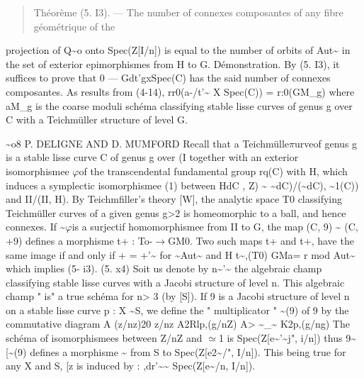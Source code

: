 \documentclass[11pt]{article}
\theoremstyle{plain}
\theoremstyle{definition}
\theoremstyle{remark}
\begin{document}
\begin{quote}Th\'eor\`eme (5. I3). --- The number of connexes composantes of any fibre g\'eom\'etrique of the\end{quote}
projection of Q\textasciitilde{}o onto Spec(Z[I/n]) is equal to the number of orbits of Aut\textasciitilde{} in the set of exterior epimorphismes from H to G. D\'emonstration. By (5. I3), it suffices to prove that 0 --- Gdt'gxSpec(C) has the said number of connexes composantes. As results from (4-14), rr0(a-/t'\textasciitilde{} X Spec(C)) = r:0(GM\_g) where aM\_g is the coarse moduli sch\'ema classifying stable lisse curves of genus g over C with a Teichm\"uller structure of level G.

\textasciitilde{}o8 P. DELIGNE AND D. MUMFORD Recall that a Teichm\"ulle$\pi$urveof genus g is a stable lisse curve C of genus g over (I together with an exterior isomorphismee $\varphi$of the transcendental fundamental group rq(C) with H, which induces a symplectic isomorphismee (1) between HdC , Z) \textasciitilde{} \textasciitilde{}dC)/(\textasciitilde{}dC), \textasciitilde{}1(C)) and II/(II, H). By Teichmfiller's theory [W], the analytic space T0 classifying Teichm\"uller curves of a given genus g>2 is homeomorphic to a ball, and hence connexes. If \textasciitilde{}$\varphi$is a surjectif homomorphismee from II to G, the map (C, 9) \textasciitilde{} (C, +9) defines a morphisme t+ : To-$\to$GM0. Two such maps t+ and t+, have the same image if and only if + = +'\textasciitilde{} for \textasciitilde{}Aut\textasciitilde{} and H t\textasciitilde{},(T0) GMa= r mod Aut\textasciitilde{} which implies (5- i3). (5. x4) Soit us denote by n\textasciitilde{}'\textasciitilde{} the algebraic champ classifying stable lisse curves with a Jacobi structure of level n. This algebraic champ " is" a true sch\'ema for n> 3 (by [S]). If 9 is a Jacobi structure of level n on a stable lisse curve p : X \textasciitilde{}S, we define the " multiplicator " \textasciitilde{}(9) of 9 by the commutative diagram A (z/nz)20 z/nz A2Rlp,(g/nZ) A> \textasciitilde{}\_\textasciitilde{} K2p,(g/ng) The sch\'ema of isomorphismees between Z/nZ and $\simeq$1 is Spec(Z[e\textasciitilde{}'\textasciitilde{}j", i/n]) thus 9\textasciitilde{}[\textasciitilde{}(9) defines a morphisme \textasciitilde{} from S to Spec(Z[e2\textasciitilde{}/", I/n]). This being true for any X and S, [z is induced by : ,dr'\textasciitilde{}\textasciitilde{} Spec(Z[e\textasciitilde{}/n, I/n]).
\end{document}
